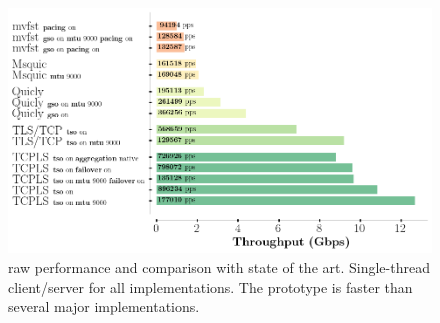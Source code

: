 \begin{figure}[!t]
  \begin{center}
    \includegraphics[width=\columnwidth]{figures/perf_analysis.png}
  \end{center}
\vspace{-0.5cm}
  \caption{\tcpls raw performance and comparison with state of the art.
    Single-thread client/server for all implementations.  The
    \tcpls prototype is faster than several major \quic implementations.}
  \label{fig:perf}
\end{figure}



